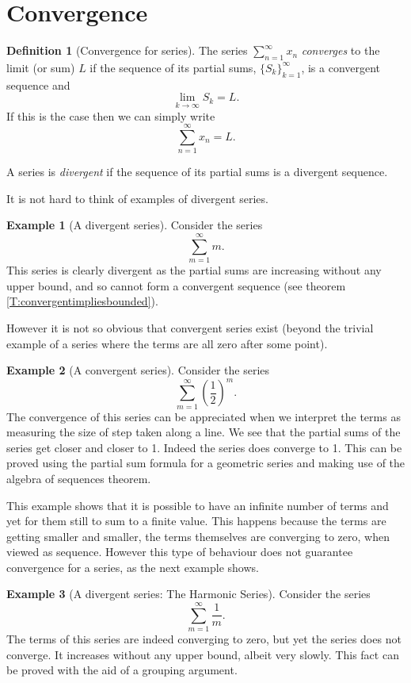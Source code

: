 \documentclass[extrafontsizes, twoside, a4paper]{memoir}
\theoremstyle{plain}%
\theoremstyle{definition}
\newtheorem{defn}{Definition}[chapter]
\newtheorem{exmp}{Example}[chapter]
\theoremstyle{remark}
\begin{document}
\section{Convergence}
\begin{defn}[Convergence for series]
The series $\sum_{n=1}^\infty x_n$ \emph{converges} to the limit (or sum) $L$ if the sequence of its partial sums, $\{ S_k \}_{k=1}^\infty$, is a convergent sequence and
$$ \lim_{k \to \infty} S_k = L . $$
If this is the case then we can simply write
$$ \sum_{n=1}^\infty x_n = L .$$

A series is \emph{divergent} if the sequence of its partial sums is a divergent sequence.
\end{defn}
It is not hard to think of examples of divergent series.
\begin{exmp}[A divergent series]
Consider the series
$$\sum_{m=1}^\infty m .$$
This series is clearly divergent as the partial sums are increasing without any upper bound, and so cannot form a convergent sequence (see theorem \ref{T:convergentimpliesbounded}).
\end{exmp}
However it is not so obvious that convergent series exist (beyond the trivial example of a series where the terms are all zero after some point).
\begin{exmp}[A convergent series]
Consider the series
$$\sum_{m=1}^\infty \left ( \frac{1}{2} \right )^m .$$
The convergence of this series can be appreciated when we interpret the terms as measuring the size of step taken along a line. We see that the partial sums of the series get closer and closer to 1. Indeed the series does converge to 1. This can be proved using the partial sum formula for a geometric series and making use of the algebra of sequences theorem.
\end{exmp}
This example shows that it is possible to have an infinite number of terms and yet for them still to sum to a finite value. This happens because the terms are getting smaller and smaller, the terms themselves are converging to zero, when viewed as sequence. However this type of behaviour does not guarantee convergence for a series, as the next example shows.
\begin{exmp}[A divergent series: The Harmonic Series]
Consider the series
$$\sum_{m=1}^\infty \frac{1}{m}.$$
The terms of this series are indeed converging to zero, but yet the series does not converge. It increases without any upper bound, albeit very slowly. This fact can be proved with the aid of a grouping argument.
\end{exmp}
\end{document}
